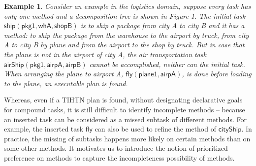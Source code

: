 \documentclass[letterpaper]{article} %
\newtheorem{examp}{Example}
\begin{document}
\begin{examp}\label{examp:incomplte_methods}
Consider an example in the logistics domain, suppose every task has only one method and a decomposition tree is shown in Figure 1.
The initial task $\mathsf{ship(pkg1,whA,shopB)}$ is to ship a package from city A to city B and
it has a method: to ship the package from the warehouse to the airport by truck, from city A to city B by plane and from the airport to the shop by truck.
But in case that the plane is not in the airport of city A, the air transportation task $\mathsf{airShip(pkg1,airpA,airpB)}$ %
cannot be accomplished, neither can the initial task.
When arranging the plane to airport A, $\mathsf{fly(plane1,airpA)}$, is done before loading to the plane, an executable plan is found.
%
\end{examp}

Whereas, even if a TIHTN plan is found, without designating declarative goals for compound tasks,
it is still difficult to identify incomplete methods -- because an inserted task can be considered as a missed subtask of different methods.
For example, the inserted task $\mathsf{fly}$ can also be used to refine the method of $\mathsf{cityShip}$.
In practice, the missing of subtasks happens more likely on certain methods than on some other methods.
It motivates us to introduce  the notion of prioritized preference on methods to capture the incompleteness possibility of methods. %
\end{document}
